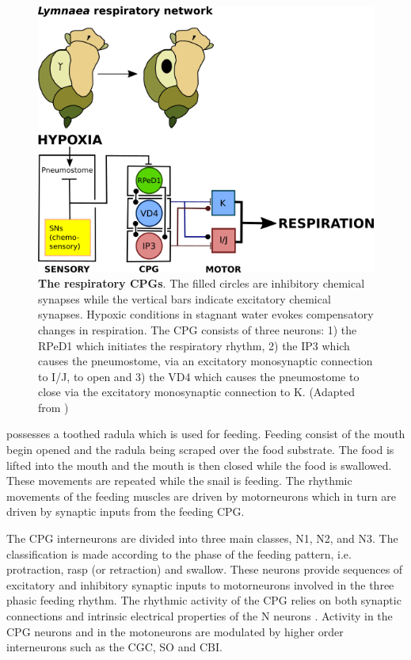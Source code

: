  \begin{figure}[H]
 	\centering
 	\includegraphics[width=\columnwidth]{graphics/lymnaea_b.png}
 	\caption[]{\textbf{The  respiratory \acp{CPG}}. The filled circles are inhibitory chemical synapses while the vertical bars indicate excitatory chemical synapses. Hypoxic conditions in stagnant water evokes compensatory changes in respiration. The \ac{CPG} consists of three neurons: 1) the \ac{RPeD1} which initiates the respiratory rhythm, 2) the \ac{IP3} which causes the pneumostome, via an excitatory monosynaptic connection to I/J, to open and 3) the \ac{VD4} which causes the pneumostome to close via the excitatory monosynaptic connection to K. (Adapted from \cite{Benjamin2008})}
 	\label{fig:Lymnaea_respiratory_network}
 \end{figure}
 
 possesses a toothed radula which is used for feeding. Feeding consist of the mouth begin opened and the radula being scraped over the food substrate. The food is lifted into the mouth and the mouth is then closed while the food is swallowed. These movements are repeated while the snail is feeding. The rhythmic movements of the feeding muscles are driven by motorneurons which in turn are driven by synaptic inputs from the feeding \ac{CPG}.

The \ac{CPG} interneurons are divided into three main classes, N1, N2, and N3. The classification is made according to the phase of the feeding pattern, i.e. protraction, rasp (or retraction) and swallow. These neurons provide  sequences of excitatory and inhibitory synaptic inputs to motorneurons involved in the three phasic feeding rhythm. The rhythmic activity of the \ac{CPG} relies on both synaptic connections and intrinsic electrical properties of the N neurons \cite{Vavoulis2007}. Activity in the \ac{CPG} neurons and in the motoneurons are modulated by higher order interneurons such as the \ac{CGC}, \ac{SO} and \ac{CBI}. 

